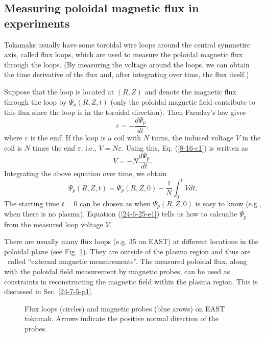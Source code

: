 \documentclass{llncs}
\begin{document}
\subsection{Measuring poloidal magnetic flux in
experiments}\label{24-11-13-p1}\label{24-6-26-1}

Tokamaks usually have some toroidal wire loops around the central symmetirc
axis, called flux loops, which are used to measure the poloidal magnetic flux
through the loops. (By measuring the voltage around the loops, we can obtain
the time derivative of the flux and, after integrating over time, the flux
itself.)

Suppose that the loop is located at $(R, Z)$ and denote the magnetic flux
through the loop by $\Psi_p (R, Z, t)$ (only the poloidal magnetic field
contribute to this flux since the loop is in the toroidal direction). Then
Faraday's law gives
\begin{equation}
  \label{8-16-e1} \varepsilon = - \frac{d \Psi_p}{d t},
\end{equation}
where $\varepsilon$ is the emf. If the loop is a coil with $N$ turns, the
induced voltage $V$ in the coil is $N$ times the emf $\varepsilon$, i.e., $V =
N \varepsilon$. Using this, Eq. (\ref{8-16-e1}) is written as
\begin{equation}
  \label{8-16-e2} V = - N \frac{d \Psi_p}{d t} .
\end{equation}
Integrating the above equation over time, we obtain
\begin{equation}
  \label{24-6-25-e1} \Psi_p (R, Z, t) = \Psi_p (R, Z, 0) - \frac{1}{N}
  \int_0^t V dt.
\end{equation}
The starting time $t = 0$ can be chosen as when $\Psi_p (R, Z, 0)$ is easy to
know (e.g., when there is no plasma). Equation (\ref{24-6-25-e1}) tells us how
to calcualte $\Psi_p$ from the measured loop voltage $V$.

There are usually many flux loops (e.g. 35 on EAST{\cite{xiao2007}}) at
different locations in the poloidal plane (see Fig. \ref{19-5-4-p1mm}). They
are outside of the plasma region and thus are \ called ``external magnetic
measurements''. The measured poloidal flux, along with the poloidal field
measurement by magnetic probes, can be used as constraints in reconstructing
the magnetic field within the plasma region. This is discussed in Sec.
\ref{24-7-5-p1}.

\begin{figure}[h]
  \caption{\label{19-5-4-p1mm}Flux loops (circles) and magnetic probes (blue
  arows) on EAST tokamak. Arrows indicate the positive normal direction of the
  probes.}
\end{figure}
\end{document}
